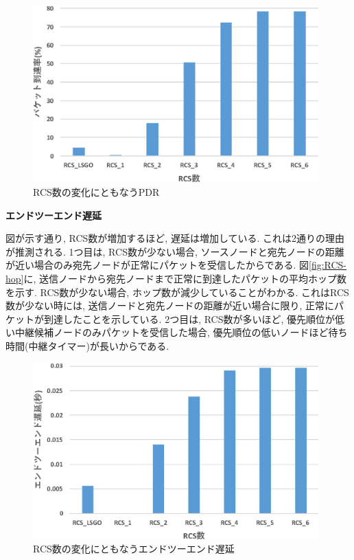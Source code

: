 \documentclass[10pt]{jreport}
\begin{document}
\begin{figure}[!ht]
	\centering
	\includegraphics[width=110mm]{figures/RCS_PDR.eps}
	\caption{RCS数の変化にともなうPDR}
	\label{fig:RCS-PDR}
\end{figure}

\par
\vspace{5mm}
\noindent
\textbf{エンドツーエンド遅延}
\vspace{5mm}

図が示す通り, RCS数が増加するほど, 遅延は増加している. これは2通りの理由が推測される. 1つ目は, RCS数が少ない場合, ソースノードと宛先ノードの距離が近い場合のみ宛先ノードが正常にパケットを受信したからである. 図\ref{fig:RCS-hop}に, 送信ノードから宛先ノードまで正常に到達したパケットの平均ホップ数を示す. RCS数が少ない場合, ホップ数が減少していることがわかる. これはRCS数が少ない時には, 送信ノードと宛先ノードの距離が近い場合に限り, 正常にパケットが到達したことを示している.
2つ目は, RCS数が多いほど, 優先順位が低い中継候補ノードのみパケットを受信した場合, 優先順位の低いノードほど待ち時間(中継タイマー)が長いからである.




\begin{figure}[!ht]
	\centering
	\includegraphics[width=110mm]{figures/RCS_Delay.eps}
	\caption{RCS数の変化にともなうエンドツーエンド遅延}
	\label{fig:RCS-delay}
\end{figure}
\end{document}
